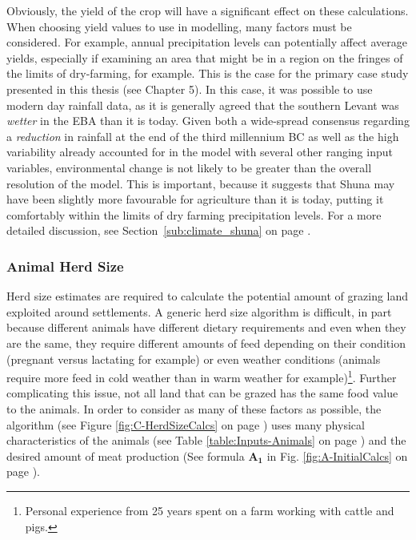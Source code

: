 Obviously, the yield of the crop will have a significant effect on these calculations.  When choosing yield values to use in modelling, many factors must be considered.  For example, annual precipitation levels can potentially affect average yields, especially if examining an area that might be in a region on the fringes of the limits of dry-farming, for example.  This is the case for the primary case study presented in this thesis (see Chapter 5).  In this case, it was possible to use modern day rainfall data, as it is generally agreed that the southern Levant was \emph{wetter} in the EBA than it is today.    Given both a wide-spread consensus regarding a \emph{reduction} in rainfall at the end of the third millennium BC as well as the high variability already accounted for in the model with several other ranging input variables, environmental change is not likely to be greater than the overall resolution of the model. This is important, because it suggests that Shuna may have been slightly more favourable for agriculture \citep[92]{Grigson2007} than it is today, putting it comfortably within the limits of dry farming precipitation levels.  For a more detailed discussion, see Section~\ref{sub:climate_shuna} on page \pageref{sub:climate_shuna}.


\subsubsection{Animal Herd Size}
	\label{animalHerdSize} 
Herd size estimates are required to calculate the potential amount of grazing land exploited around settlements.
A generic herd size algorithm is difficult, in part because different animals have different dietary requirements and even when they are the same, they require different amounts of feed depending on their condition (pregnant versus lactating for example) or even weather conditions (animals require more feed in cold weather than in warm weather for example)\footnote{Personal experience from 25 years spent on a farm working with cattle and pigs.}. Further complicating this issue, not all land that can be grazed has the same food value to the animals.  In order to consider as many of these factors as possible, the algorithm (see Figure \ref{fig:C-HerdSizeCalcs} on page \pageref{fig:C-HerdSizeCalcs}) uses many physical characteristics of the animals (see Table \ref{table:Inputs-Animals} on page \pageref{table:Inputs-Animals}) and the desired amount of meat production (See formula $\mathbf{A_1}$ in Fig. \ref{fig:A-InitialCalcs} on page \pageref{fig:A-InitialCalcs}).%

